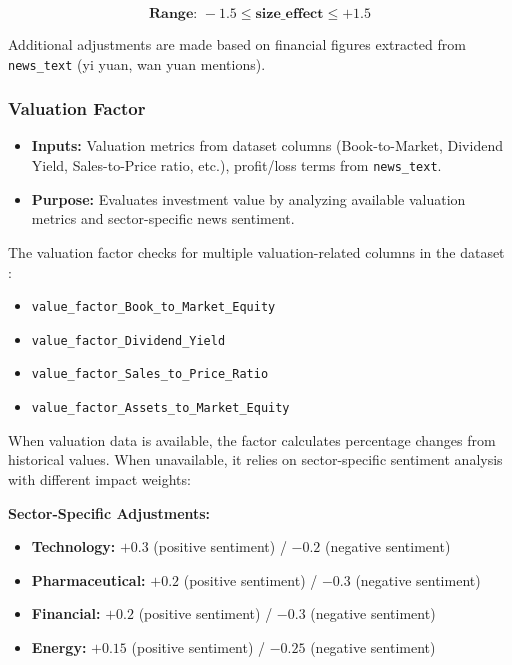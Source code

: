 \documentclass[3p,times,procedia]{elsarticle}
\begin{document}
\begin{equation}
\textbf{Range: } -1.5 \leq \textbf{size\_effect} \leq +1.5
\end{equation}

Additional adjustments are made based on financial figures extracted from \texttt{news\_text} (yi yuan, wan yuan mentions).

\subsubsection{{Valuation Factor}}
\begin{itemize}
    \item \textbf{Inputs:} Valuation metrics from dataset columns \cite{FinReportDataset2025} (Book-to-Market, Dividend Yield, Sales-to-Price ratio, etc.), profit/loss terms from \texttt{news\_text}.
    \item \textbf{Purpose:} Evaluates investment value by analyzing available valuation metrics and sector-specific news sentiment.
\end{itemize}

The valuation factor checks for multiple valuation-related columns in the dataset \cite{FinReportDataset2025}:

\begin{itemize}
    \item \texttt{value\_factor\_Book\_to\_Market\_Equity}
    \item \texttt{value\_factor\_Dividend\_Yield}  
    \item \texttt{value\_factor\_Sales\_to\_Price\_Ratio}
    \item \texttt{value\_factor\_Assets\_to\_Market\_Equity}
\end{itemize}

When valuation data is available, the factor calculates percentage changes from historical values. When unavailable, it relies on sector-specific sentiment analysis with different impact weights:

\textbf{Sector-Specific Adjustments:}
\begin{itemize}
    \item \textbf{Technology:} $+0.3$ (positive sentiment) / $-0.2$ (negative sentiment)
    \item \textbf{Pharmaceutical:} $+0.2$ (positive sentiment) / $-0.3$ (negative sentiment)
    \item \textbf{Financial:} $+0.2$ (positive sentiment) / $-0.3$ (negative sentiment)
    \item \textbf{Energy:} $+0.15$ (positive sentiment) / $-0.25$ (negative sentiment)
\end{itemize}
\end{document}
